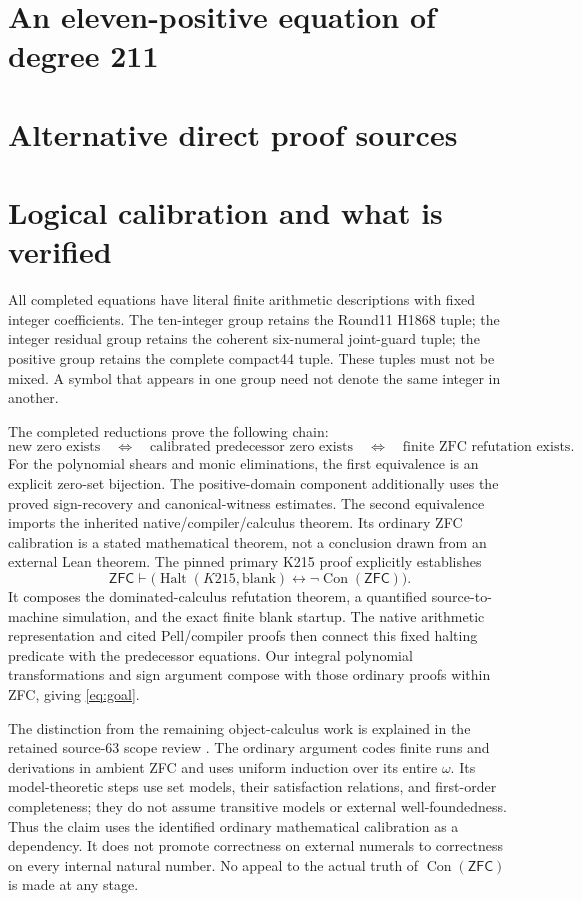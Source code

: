 \documentclass[11pt]{article}
\theoremstyle{definition}
\theoremstyle{remark}
\newcommand{\Con}{\operatorname{Con}}
\newcommand{\ZFC}{\mathsf{ZFC}}
\begin{document}
\section{An eleven-positive equation of degree 211}
\label{sec:positive}


\section{Alternative direct proof sources}
\label{sec:alternative}


\section{Logical calibration and what is verified}

All completed equations have literal finite arithmetic descriptions with
fixed integer coefficients. The ten-integer group retains the Round11
H1868 tuple; the integer residual group retains the coherent six-numeral
joint-guard tuple; the positive group retains the complete compact44 tuple.
These tuples must not be mixed. A symbol that appears in one group need
not denote the same integer in another.

The completed reductions prove the following chain:
\[
 \text{new zero exists}\quad\Longleftrightarrow\quad
 \text{calibrated predecessor zero exists}\quad\Longleftrightarrow\quad
 \text{finite ZFC refutation exists}.
\]
For the polynomial shears and monic eliminations, the first equivalence is
an explicit zero-set bijection. The positive-domain component additionally
uses the proved sign-recovery and canonical-witness estimates. The second
equivalence imports the inherited native/compiler/calculus theorem. Its
ordinary ZFC calibration is a stated mathematical theorem, not a conclusion
drawn from an external Lean theorem. The pinned primary K215 proof
\cite{k215} explicitly establishes
\[
 \ZFC\vdash
 \bigl(\operatorname{Halt}(K215,\text{blank})
       \longleftrightarrow\neg\Con(\ZFC)\bigr).
\]
It composes the dominated-calculus refutation theorem, a quantified
source-to-machine simulation, and the exact finite blank startup.
The native arithmetic representation and cited Pell/compiler proofs
then connect this fixed halting predicate with the predecessor equations.
Our integral polynomial transformations and sign argument compose with
those ordinary proofs within ZFC, giving \eqref{eq:goal}.

The distinction from the remaining object-calculus work is explained in
the retained source-63 scope review \cite{zfcscope}. The ordinary argument
codes finite runs and derivations in ambient ZFC and uses uniform
induction over its entire $\omega$. Its model-theoretic steps use set
models, their satisfaction relations, and first-order completeness; they
do not assume transitive models or external well-foundedness. Thus the
claim uses the identified ordinary mathematical calibration as a
dependency. It does not promote correctness on external numerals to
correctness on every internal natural number. No appeal to the actual
truth of $\Con(\ZFC)$ is made at any stage.
\end{document}
